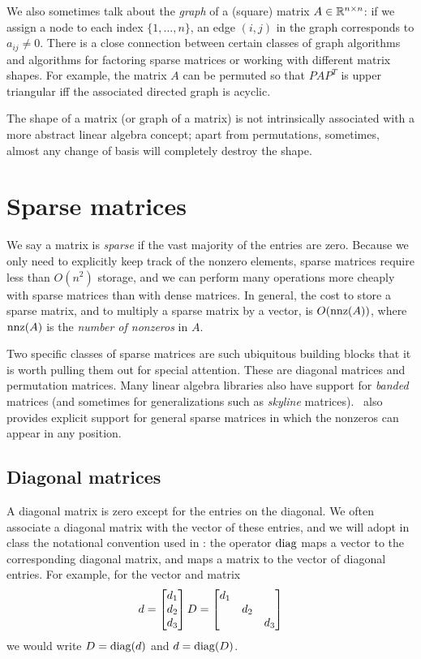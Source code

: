 \documentclass[12pt, leqno]{article} %
\begin{document}
We also sometimes talk about the {\em graph} of a (square) matrix
$A \in \mathbb{R}^{n \times n}$: if we assign a node to each index
$\{1, \ldots, n\}$, an edge $(i,j)$ in the graph corresponds
to $a_{ij} \neq 0$.  There is a close connection between certain
classes of graph algorithms and algorithms for factoring sparse
matrices or working with different matrix shapes.  For example,
the matrix $A$ can be permuted so that $P A P^T$ is upper triangular
iff the associated directed graph is acyclic.

The shape of a matrix (or graph of a matrix) is not intrinsically
associated with a more abstract linear algebra concept; apart from
permutations, sometimes, almost any change of basis will completely
destroy the shape.

\section{Sparse matrices}

We say a matrix is {\em sparse} if the vast majority of the entries are
zero.  Because we only need to explicitly keep track of the nonzero
elements, sparse matrices require less than $O(n^2)$ storage, and we
can perform many operations more cheaply with sparse matrices than with
dense matrices.  In general, the cost to store a sparse matrix, and to
multiply a sparse matrix by a vector, is $O(\operatorname{nnz}(A))$, where $\operatorname{nnz}(A)$
is the {\em number of nonzeros} in $A$.

Two specific classes of sparse matrices are such ubiquitous building
blocks that it is worth pulling them out for special attention.
These are diagonal matrices and permutation matrices.  Many linear
algebra libraries also have support for {\em banded} matrices
(and sometimes for generalizations such as {\em skyline} matrices).
\matlab\ also provides explicit support for general sparse matrices
in which the nonzeros can appear in any position.

\subsection{Diagonal matrices}

A diagonal matrix is zero except for the entries on the diagonal.
We often associate a diagonal matrix with the vector of these entries,
and we will adopt in class the notational convention used in \matlab:
the operator $\operatorname{diag}$ maps a vector to the corresponding diagonal matrix,
and maps a matrix to the vector of diagonal entries.  For example,
for the vector and matrix
\[
  d = \begin{bmatrix} d_1 \\ d_2 \\ d_3 \end{bmatrix} \\
  D = \begin{bmatrix} d_1 & & \\ & d_2 & \\ & & d_3 \end{bmatrix}
\]
we would write $D = \operatorname{diag}(d)$ and $d = \operatorname{diag}(D)$.
\end{document}
